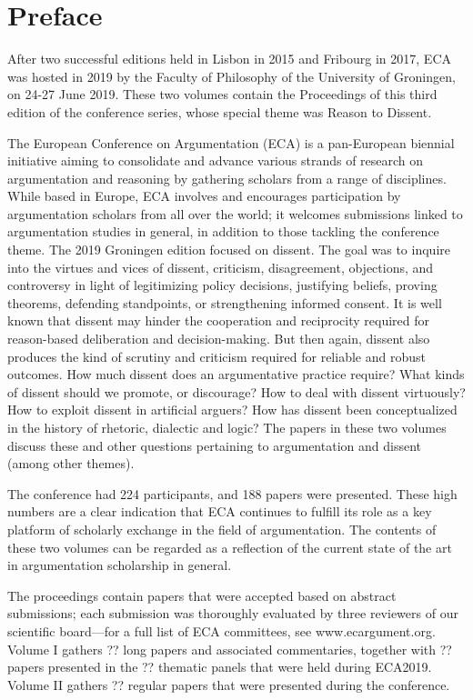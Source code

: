 \section*{Preface}

After two successful editions held in Lisbon in 2015 and Fribourg in 2017, ECA was hosted in 2019 by the Faculty of Philosophy of the University of Groningen, on 24-27 June 2019. These two volumes contain the Proceedings of this third edition of the conference series, whose special theme was Reason to Dissent.

The European Conference on Argumentation (ECA) is a pan-European biennial initiative aiming to consolidate and advance various strands of research on argumentation and reasoning by gathering scholars from a range of disciplines. While based in Europe, ECA involves and encourages participation by argumentation scholars from all over the world; it welcomes submissions linked to argumentation studies in general, in addition to those tackling the conference theme. The 2019 Groningen edition focused on dissent. The goal was to inquire into the virtues and vices of dissent, criticism, disagreement, objections, and controversy in light of legitimizing policy decisions, justifying beliefs, proving theorems, defending standpoints, or strengthening informed consent. It is well known that dissent may hinder the cooperation and reciprocity required for reason-based deliberation and decision-making. But then again, dissent also produces the kind of scrutiny and criticism required for reliable and robust outcomes. How much dissent does an argumentative practice require? What kinds of dissent should we promote, or discourage? How to deal with dissent virtuously? How to exploit dissent in artificial arguers? How has dissent been conceptualized in the history of rhetoric, dialectic and logic? The papers in these two volumes discuss these and other questions pertaining to argumentation and dissent (among other themes).

The conference had 224 participants, and 188 papers were presented. These high numbers are a clear indication that ECA continues to fulfill its role as a key platform of scholarly exchange in the field of argumentation. The contents of these two volumes can be regarded as a reflection of the current state of the art in argumentation scholarship in general.

The proceedings contain papers that were accepted based on abstract submissions; each submission was thoroughly evaluated by three reviewers of our scientific board—for a full list of ECA committees, see www.ecargument.org. Volume I gathers ?? long papers and associated commentaries, together with ?? papers presented in the ?? thematic panels that were held during ECA2019. Volume II gathers ?? regular papers that were presented during the conference. 

